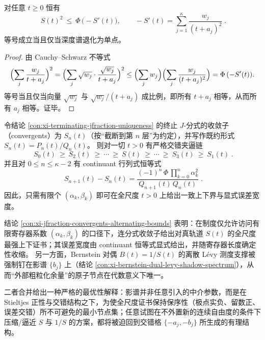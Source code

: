 \begin{proposition}\label{con:xi-scale-cauchy-schwarz}
对任意 \(t\ge 0\) 恒有
\[
\boxed{\;
S(t)^2\ \le\ \Phi\,\bigl(-S'(t)\bigr),
\qquad
-S'(t)=\sum_{j=1}^{\kappa}\frac{w_j}{(t+a_j)^2}\; }.
\]
等号成立当且仅当深度谱退化为单点。
\end{proposition}
\begin{proof}
由 Cauchy--Schwarz 不等式
\[
\Bigl(\sum_j \frac{w_j}{t+a_j}\Bigr)^2
=\Bigl(\sum_j \sqrt{w_j}\cdot\frac{\sqrt{w_j}}{t+a_j}\Bigr)^2
\le \Bigl(\sum_j w_j\Bigr)\Bigl(\sum_j \frac{w_j}{(t+a_j)^2}\Bigr)
=\Phi\,(-S'(t)).
\]
等号当且仅当向量 \(\sqrt{w_j}\) 与 \(\sqrt{w_j}/(t+a_j)\) 成比例，即所有 \(t+a_j\) 相等，从而所有 \(a_j\) 相等。证毕。
\end{proof}

\begin{proposition}\label{con:xi-jfraction-convergents-alternating-bounds}
令结论 \ref{con:xi-terminating-jfraction-uniqueness} 的终止 \texorpdfstring{$J$}{J}-分式的收敛子（convergents）为 \(S_n(t)\)（按“截断到第 \(n\) 层”为约定），并写作既约形式 \(S_n(t)=P_n(t)/Q_n(t)\)。
则对一切 \(t>0\) 有严格交错夹逼链
\[
\boxed{\;
S_0(t)\ \ge\ S_2(t)\ \ge\ \cdots\ \ge\ S(t)\ \ge\ \cdots\ \ge\ S_3(t)\ \ge\ S_1(t)\; }.
\]
并且对 \(0\le n\le \kappa-2\) 有 continuant 行列式恒等式
\[
\boxed{\;
S_{n+1}(t)-S_n(t)=
\frac{(-1)^n\,\Phi\,\prod_{k=0}^{n}\alpha_k^2}{Q_{n+1}(t)\,Q_{n}(t)}\; }.
\]
因此，只需有限个 \((\alpha_k,\beta_k)\) 即可在全尺度 \(t>0\) 上给出一致上下界与显式误差宽度。
\end{proposition}

\begin{remark}\label{rem:xi-shadow-spectrum-optimal-compression-nodes}
结论 \ref{con:xi-jfraction-convergents-alternating-bounds} 表明：在制度仅允许访问有限寄存器系数 \((\alpha_k,\beta_k)\) 的口径下，连分式收敛子给出对真轨道 \(S(t)\) 的全尺度最强上下证书；其误差宽度由 continuant 恒等式显式给出，并随寄存器长度确定性收缩。
另一方面，Bernstein 对偶 \(B(t)=1/S(t)\) 的离散 Lévy 测度支撑被强制钉在影谱 \(\{b_j\}\) 上（结论 \ref{con:xi-bernstein-dual-levy-shadow-spectrum}），从而“外部粗粒化余量”的原子节点在代数意义下唯一。
\par
二者合并给出一种严格的最优性解释：影谱并非任意引入的中介参数，而是在 Stieltjes 正性与交错结构之下，为使全尺度证书保持保序性（极点实负、留数正、误差交错）所不可避免的最小节点集；任意试图在不外置新的连续自由度的条件下压缩/逼近 \(S\) 与 \(1/S\) 的方案，都将被迫回到交错格 \(\{-a_j,-b_j\}\) 所生成的有理结构。
\end{remark}

